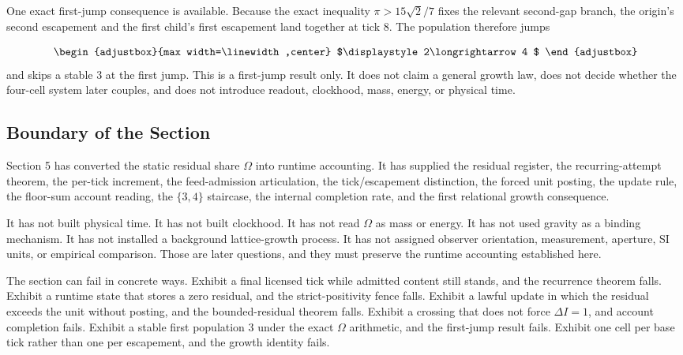 One exact first-jump consequence is available. Because the exact inequality \(\pi>15\sqrt{2}/7\) fixes the relevant second-gap branch, the origin's second escapement and the first child's first escapement land together at tick \(8\). The population therefore jumps

\begin{equation*}
\begin{adjustbox}{max width=\linewidth,center}
$\displaystyle
2\longrightarrow 4
$
\end{adjustbox}
\end{equation*}
and skips a stable \(3\) at the first jump. This is a first-jump result only. It does not claim a general growth law, does not decide whether the four-cell system later couples, and does not introduce readout, clockhood, mass, energy, or physical time.

\subsection{Boundary of the Section}
Section 5 has converted the static residual share \(\Omega\) into runtime accounting. It has supplied the residual register, the recurring-attempt theorem, the per-tick increment, the feed-admission articulation, the tick/escapement distinction, the forced unit posting, the update rule, the floor-sum account reading, the \(\{3,4\}\) staircase, the internal completion rate, and the first relational growth consequence.

It has not built physical time. It has not built clockhood. It has not read \(\Omega\) as mass or energy. It has not used gravity as a binding mechanism. It has not installed a background lattice-growth process. It has not assigned observer orientation, measurement, aperture, SI units, or empirical comparison. Those are later questions, and they must preserve the runtime accounting established here.

The section can fail in concrete ways. Exhibit a final licensed tick while admitted content still stands, and the recurrence theorem falls. Exhibit a runtime state that stores a zero residual, and the strict-positivity fence falls. Exhibit a lawful update in which the residual exceeds the unit without posting, and the bounded-residual theorem falls. Exhibit a crossing that does not force \(\Delta I=1\), and account completion fails. Exhibit a stable first population \(3\) under the exact \(\Omega\) arithmetic, and the first-jump result fails. Exhibit one cell per base tick rather than one per escapement, and the growth identity fails.

